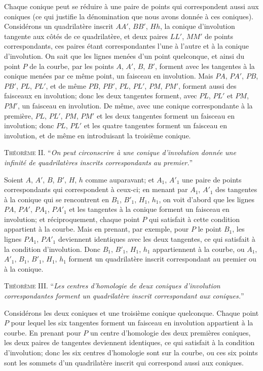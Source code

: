 \documentclass[12pt,a4paper]{article}
\begin{document}
Chaque conique peut se r\'eduire \`a une paire de points qui correspondent aussi aux coniques (ce qui justifie la d\'enomination que nous avons donn\'ee \`a ces coniques). Consid\'erons un quadrilat\`ere inscrit $AA'$, $BB'$, $Hh$, la conique d'involution tangente aux c\^ot\'es de ce quadrilat\`ere, et deux paires $LL'$, $MM'$ de points correspondants, ces paires \'etant correspondantes l'une \`a l'autre et \`a la conique d'involution. On sait que les lignes men\'ees d'un point quelconque, et ainsi du point $P$ de la courbe, par les points $A$, $A'$, $B$, $B'$, forment avec les tangentes \`a la conique men\'ees par ce m\^eme point, un faisceau en involution. Mais $PA$, $PA'$, $PB$, $PB'$, $PL$, $PL'$, et de m\^eme $PB$, $PB'$, $PL$, $PL'$, $PM$, $PM'$, forment aussi des faisceaux en involution; donc les deux tangentes forment, avec $PL$, $PL'$ et $PM$, $PM'$, un faisceau en involution. De m\^eme, avec une conique correspondante \`a la premi\`ere, $PL$, $PL'$, $PM$, $PM'$ et les deux tangentes forment un faisceau en involution; donc $PL$, $PL'$ et les quatre tangentes forment un faisceau en involution, et de m\^eme en introduisant la troisi\`eme conique.

\medskip
\textsc{Th\'eor\`eme II.} ``\textit{On peut circonscrire \`a une conique d'involution donn\'ee une infinit\'e de quadrilat\`eres inscrits correspondants au premier.}''

Soient $A$, $A'$, $B$, $B'$, $H$, $h$ comme auparavant; et $A_1$, $A'_1$ une paire de points correspondants qui correspondent \`a ceux-ci; en menant par $A_1$, $A'_1$ des tangentes \`a la conique qui se rencontrent en $B_1$, $B'_1$, $H_1$, $h_1$, on voit d'abord que les lignes $PA$, $PA'$, $PA_1$, $PA'_1$ et les tangentes \`a la conique forment un faisceau en involution; et r\'eciproquement, chaque point $P$ qui satisfait \`a cette condition appartient \`a la courbe. Mais en prenant, par exemple, pour $P$ le point $B_1$, les lignes $PA_1$, $PA'_1$ deviennent identiques avec les deux tangentes, ce qui satisfait \`a la condition d'involution. Donc $B_1$, $B'_1$, $H_1$, $h_1$ appartiennent \`a la courbe, ou $A_1$, $A'_1$, $B_1$, $B'_1$, $H_1$, $h_1$ forment un quadrilat\`ere inscrit correspondant au premier ou \`a la conique.

\medskip
\textsc{Th\'eor\`eme III.} ``\textit{Les centres d'homologie de deux coniques d'involution correspondantes forment un quadrilat\`ere inscrit correspondant aux coniques.}''

Consid\'erons les deux coniques et une troisi\`eme conique quelconque. Chaque point $P$ pour lequel les six tangentes forment un faisceau en involution appartient \`a la courbe. En prenant pour $P$ un centre d'homologie des deux premi\`eres coniques, les deux paires de tangentes deviennent identiques, ce qui satisfait \`a la condition d'involution; donc les six centres d'homologie sont sur la courbe, ou ces six points sont les sommets d'un quadrilat\`ere inscrit qui correspond aussi aux coniques.
\end{document}
